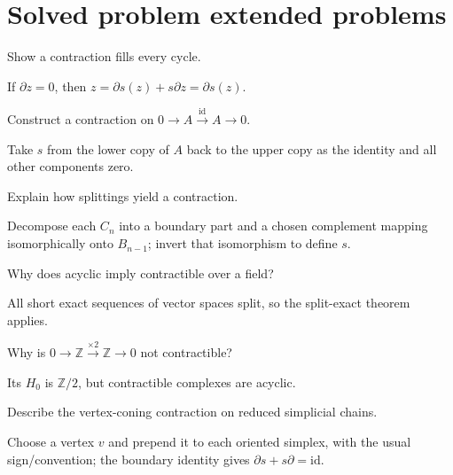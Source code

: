\section{Solved problem extended problems}

\begin{problem}\label{prob:viii23-01}
Show a contraction fills every cycle.
\end{problem}
\begin{solution}
If \(\partial z=0\), then \(z=\partial s(z)+s\partial z=\partial s(z)\).
\end{solution}

\begin{problem}\label{prob:viii23-02}
Construct a contraction on \(0\to A\xrightarrow{\mathrm{id}}A\to0\).
\end{problem}
\begin{solution}
Take \(s\) from the lower copy of \(A\) back to the upper copy as the identity and all other components zero.
\end{solution}

\begin{problem}\label{prob:viii23-03}
Explain how splittings yield a contraction.
\end{problem}
\begin{solution}
Decompose each \(C_n\) into a boundary part and a chosen complement mapping isomorphically onto \(B_{n-1}\); invert that isomorphism to define \(s\).
\end{solution}

\begin{problem}\label{prob:viii23-04}
Why does acyclic imply contractible over a field?
\end{problem}
\begin{solution}
All short exact sequences of vector spaces split, so the split-exact theorem applies.
\end{solution}

\begin{problem}\label{prob:viii23-05}
Why is \(0\to\mathbb Z\xrightarrow{\times2}\mathbb Z\to0\) not contractible?
\end{problem}
\begin{solution}
Its \(H_0\) is \(\mathbb Z/2\), but contractible complexes are acyclic.
\end{solution}

\begin{problem}\label{prob:viii23-06}
Describe the vertex-coning contraction on reduced simplicial chains.
\end{problem}
\begin{solution}
Choose a vertex \(v\) and prepend it to each oriented simplex, with the usual sign/convention; the boundary identity gives \(\partial s+s\partial=\mathrm{id}\).
\end{solution}

